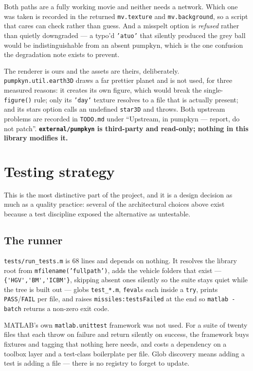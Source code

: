 \documentclass[11pt]{article}
\newcommand{\code}[1]{\texttt{#1}}
\begin{document}
Both paths are a fully working movie and neither needs a network. Which one was
taken is recorded in the returned \code{mv.texture} and \code{mv.background},
so a script that cares can check rather than guess. And a misspelt option is
\emph{refused} rather than quietly downgraded --- a typo'd \code{'atuo'} that
silently produced the grey ball would be indistinguishable from an absent
pumpkyn, which is the one confusion the degradation note exists to prevent.

The renderer is ours and the assets are theirs, deliberately.
\code{pumpkyn.util.earth3D} draws a far prettier planet and is not used, for
three measured reasons: it creates its own figure, which would break the
single-\code{figure()} rule; only its \code{'day'} texture resolves to a file
that is actually present; and its stars option calls an undefined
\code{star3D} and throws. Both upstream problems are recorded in
\code{TODO.md} under ``Upstream, in pumpkyn --- report, do not patch''.
\textbf{\code{external/pumpkyn} is third-party and read-only; nothing in this
library modifies it.}

\section{Testing strategy}
\label{sec:test}

This is the most distinctive part of the project, and it is a design decision
as much as a quality practice: several of the architectural choices above exist
because a test discipline exposed the alternative as untestable.

\subsection{The runner}

\code{tests/run\_tests.m} is 68 lines and depends on nothing. It resolves the
library root from \code{mfilename('fullpath')}, adds the vehicle folders that
exist --- \lstinline|{'HGV','BM','ICBM'}|, skipping absent ones silently so the
suite stays quiet while the tree is built out --- globs \code{test\_*.m},
\code{feval}s each inside a \code{try}, prints \code{PASS}/\code{FAIL} per
file, and raises \code{missiles:testsFailed} at the end so
\code{matlab -batch} returns a non-zero exit code.

MATLAB's own \code{matlab.unittest} framework was not used. For a suite of
twenty files that each throw on failure and return silently on success, the
framework buys fixtures and tagging that nothing here needs, and costs a
dependency on a toolbox layer and a test-class boilerplate per file. Glob
discovery means adding a test is adding a file --- there is no registry to
forget to update.
\end{document}
